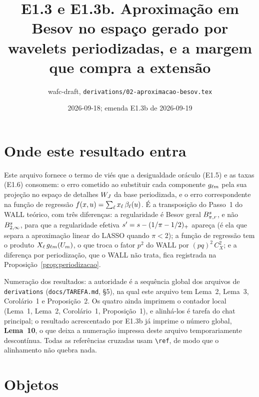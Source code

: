 \documentclass[11pt,a4paper]{article}
\title{E1.3 e E1.3b. Aproximação em Besov no espaço gerado por wavelets
periodizadas, e a margem que compra a extensão}
\author{wafc-draft, \texttt{derivations/02-aproximacao-besov.tex}}
\date{2026-09-18; emenda E1.3b de 2026-09-19}
\begin{document}
\maketitle

\section*{Onde este resultado entra}

Este arquivo fornece o termo de viés que a desigualdade oráculo (E1.5) e as
taxas (E1.6) consomem: o erro cometido ao substituir cada componente
$g_{\ell m}$ pela sua projeção no espaço de detalhes $W_{J}$ da base
periodizada, e o erro correspondente na função de regressão
$f(x,u) = \sum_{\ell} x_{\ell}\,\beta_{\ell}(u)$. É a transposição do Passo~1
do WALL teórico, com três diferenças: a regularidade é Besov geral
$B^{s}_{\pi,r}$, e não $B^{s}_{2,\infty}$, para que a regularidade
efetiva $s' = s - (1/\pi - 1/2)_{+}$ apareça (é ela que separa a aproximação
linear do LASSO quando $\pi < 2$); a função de regressão tem o produto
$X_{\ell}\,g_{\ell m}(U_{m})$, o que troca o fator $p^{2}$ do WALL por
$(pq)^{2}\,C_{X}^{2}$; e a diferença por periodização, que o WALL não trata,
fica registrada na Proposição~\ref{prop:periodizacao}.

Numeração dos resultados: a autoridade é a sequência global dos arquivos de
\texttt{derivations} (\texttt{docs/TAREFA.md}, §5), na qual este arquivo tem
Lema~2, Lema~3, Corolário~1 e Proposição~2. Os quatro ainda imprimem o
contador local (Lema~1, Lema~2, Corolário~1, Proposição~1), e alinhá-los é
tarefa do chat principal; o resultado acrescentado por E1.3b já imprime o
número global, \textbf{Lema~10}, o que deixa a numeração impressa deste
arquivo temporariamente descontínua. Todas as referências cruzadas usam
\texttt{\textbackslash ref}, de modo que o alinhamento não quebra nada.

\section{Objetos}
\end{document}
